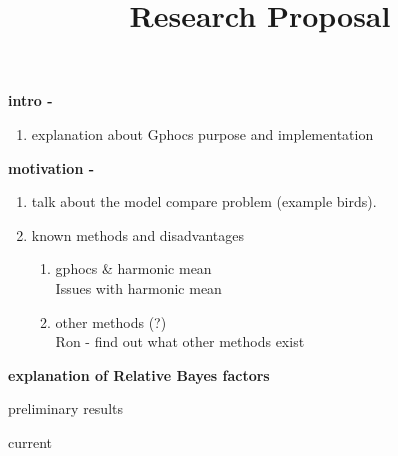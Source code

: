 \documentclass[10pt,a4paper]{article}
\title{Research Proposal}
\begin{document}
\maketitle

\textbf{intro - }
\begin{enumerate}
\item explanation about Gphocs purpose and implementation
\end{enumerate}

\textbf{motivation - }
\begin{enumerate}
\item talk about the model compare problem (example birds). \item known methods and disadvantages
\begin{enumerate}
\item gphocs \& harmonic mean\\
Issues with harmonic mean

\item other methods (?)\\
Ron - find out what other methods exist
\end{enumerate}
\end{enumerate}

\textbf{explanation of Relative Bayes factors }

preliminary results


current
\end{document}
